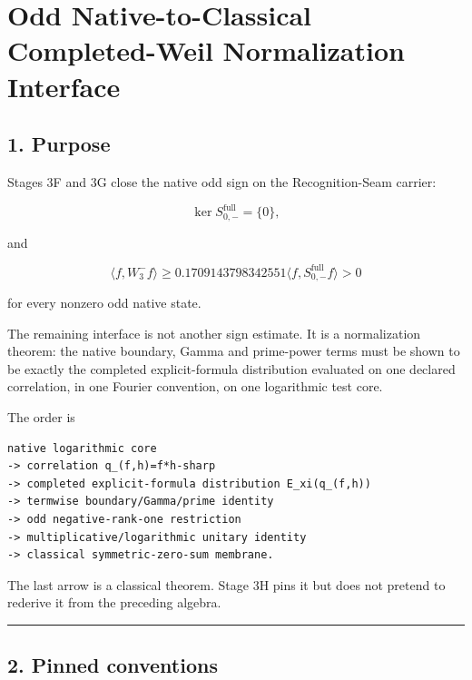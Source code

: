 \hypertarget{odd-native-to-classical-completed-weil-normalization-interface}{%
\chapter{Odd Native-to-Classical Completed-Weil Normalization Interface}\label{odd-native-to-classical-completed-weil-normalization-interface}}

\hypertarget{purpose}{%
\section{1. Purpose}\label{purpose}}

Stages 3F and 3G close the native odd sign on the Recognition-Seam carrier:

\[
\ker S_{0,-}^{\mathrm{full}}=\{0\},
\]

and

\[
\langle f,W_3^-f\rangle
\ge
0.1709143798342551
\langle f,S_{0,-}^{\mathrm{full}}f\rangle
>0
\]

for every nonzero odd native state.

The remaining interface is not another sign estimate. It is a normalization
theorem: the native boundary, Gamma and prime-power terms must be shown to be
exactly the completed explicit-formula distribution evaluated on one declared
correlation, in one Fourier convention, on one logarithmic test core.

The order is

\begin{verbatim}
native logarithmic core
-> correlation q_(f,h)=f*h-sharp
-> completed explicit-formula distribution E_xi(q_(f,h))
-> termwise boundary/Gamma/prime identity
-> odd negative-rank-one restriction
-> multiplicative/logarithmic unitary identity
-> classical symmetric-zero-sum membrane.
\end{verbatim}

The last arrow is a classical theorem. Stage 3H pins it but does not pretend to
rederive it from the preceding algebra.

\begin{center}\rule{0.5\linewidth}{0.5pt}\end{center}

\hypertarget{pinned-conventions}{%
\section{2. Pinned conventions}\label{pinned-conventions}}

